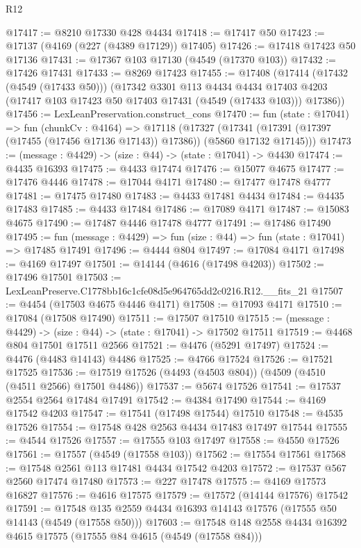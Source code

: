 \begin{lexlean}{R12}
\begin{coremodule}
@17417 := @8210 @17330 @428 @4434
@17418 := @17417 @50
@17423 := @17137 (@4169 (@227 (@4389 @17129)) @17405)
@17426 := @17418 @17423 @50 @17136
@17431 := @17367 @103 @17130 (@4549 (@17370 @103))
@17432 := @17426 @17431
@17433 := @8269 @17423
@17455 := @17408
    (@17414
      (@17432 (@4549 (@17433 @50)))
      (@17342
        @3301
        @113
        @4434
        @4434
        @17403
        @4203
        (@17417 @103 @17423 @50 @17403 @17431 (@4549 (@17433 @103)))
        @17386))
@17456 := LexLeanPreservation.construct_cons
@17470 := fun (state : @17041) =>
  fun (chunkCv : @4164) =>
  @17118
    (@17327 (@17341 (@17391 (@17397 (@17455 (@17456 @17136 @17143)) @17386)) (@5860 @17132 @17145)))
@17473 := (message : @4429) -> (size : @44) -> (state : @17041) -> @4430
@17474 := @4435 @16393
@17475 := @4433 @17474
@17476 := @15077 @4675
@17477 := @17476 @4446
@17478 := @17044 @4171
@17480 := @17477 @17478 @4777
@17481 := @17475 @17480
@17483 := @4433 @17481 @4434
@17484 := @4435 @17483
@17485 := @4433 @17484
@17486 := @17089 @4171
@17487 := @15083 @4675
@17490 := @17487 @4446 @17478 @4777
@17491 := @17486 @17490
@17495 := fun (message : @4429) => fun (size : @44) => fun (state : @17041) => @17485 @17491
@17496 := @4444 @804
@17497 := @17084 @4171
@17498 := @4169 @17497
@17501 := @14144 (@4616 (@17498 @4203))
@17502 := @17496 @17501
@17503 := LexLeanPreserve.C1778bb16c1cfe08d5e964765dd2c0216.R12.__fits_21
@17507 := @4454 (@17503 @4675 @4446 @4171)
@17508 := @17093 @4171
@17510 := @17084 (@17508 @17490)
@17511 := @17507 @17510
@17515 := (message : @4429) -> (size : @44) -> (state : @17041) -> @17502 @17511
@17519 := @4468 @804 @17501 @17511 @2566
@17521 := @4476 (@5291 @17497)
@17524 := @4476 (@4483 @14143) @4486
@17525 := @4766 @17524
@17526 := @17521 @17525
@17536 := @17519 @17526 (@4493 (@4503 @804)) (@4509 (@4510 (@4511 @2566) @17501 @4486))
@17537 := @5674 @17526
@17541 := @17537 @2554 @2564 @17484 @17491
@17542 := @4384 @17490
@17544 := @4169 @17542 @4203
@17547 := @17541 (@17498 @17544) @17510
@17548 := @4535 @17526
@17554 := @17548 @428 @2563 @4434 @17483 @17497 @17544
@17555 := @4544 @17526
@17557 := @17555 @103 @17497
@17558 := @4550 @17526
@17561 := @17557 (@4549 (@17558 @103))
@17562 := @17554 @17561
@17568 := @17548 @2561 @113 @17481 @4434 @17542 @4203
@17572 := @17537 @567 @2560 @17474 @17480
@17573 := @227 @17478
@17575 := @4169 @17573 @16827
@17576 := @4616 @17575
@17579 := @17572 (@14144 @17576) @17542
@17591 := @17548 @135 @2559 @4434 @16393 @14143 @17576 (@17555 @50 @14143 (@4549 (@17558 @50)))
@17603 := @17548 @148 @2558 @4434 @16392 @4615 @17575 (@17555 @84 @4615 (@4549 (@17558 @84)))

\end{coremodule}
\end{lexlean}

